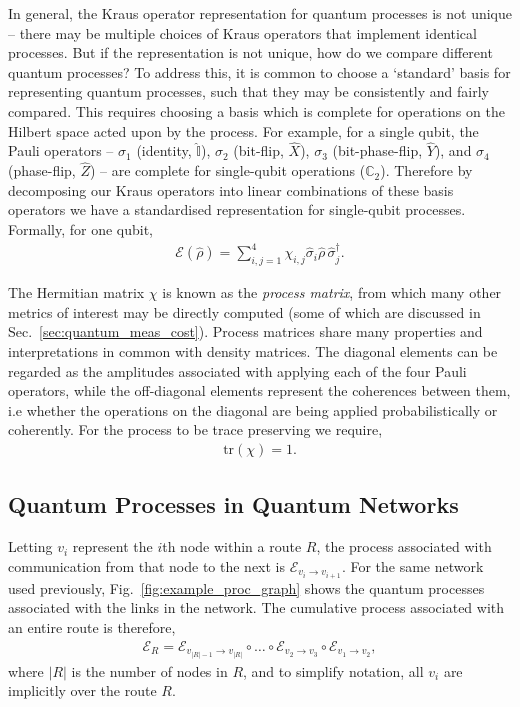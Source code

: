 \documentclass[aps,rmp,twocolumn,amsmath,amssymb,nofootinbib,superscriptaddress]{revtex4}
\begin{document}
In general, the Kraus operator representation for quantum processes is not unique -- there may be multiple choices of Kraus operators that implement identical processes. But if the representation is not unique, how do we compare different quantum processes? To address this, it is common to choose a `standard' basis for representing quantum processes, such that they may be consistently and fairly compared. This requires choosing a basis which is complete for operations on the Hilbert space acted upon by the process. For example, for a single qubit, the Pauli operators -- $\sigma_1$ (identity, $\mathbb{\hat{I}}$), $\sigma_2$ (bit-flip, $\hat{X}$), $\sigma_3$ (bit-phase-flip, $\hat{Y}$), and $\sigma_4$ (phase-flip, $\hat{Z}$) -- are complete for single-qubit operations ($\mathbb{C}_2$). Therefore by decomposing our Kraus operators into linear combinations of these basis operators we have a standardised representation for single-qubit processes. Formally, for one qubit,
\begin{align}
\mathcal{E}(\hat\rho) = \sum_{i,j=1}^4 \chi_{i,j} \hat{\sigma}_i\hat\rho\,\hat{\sigma}_j^\dag.
\end{align}

The Hermitian matrix $\chi$ is known as the \emph{process matrix}, from which many other metrics of interest may be directly computed (some of which are discussed in Sec.~\ref{sec:quantum_meas_cost}). Process matrices share many properties and interpretations in common with density matrices. The diagonal elements can be regarded as the amplitudes associated with applying each of the four Pauli operators, while the off-diagonal elements represent the coherences between them, i.e whether the operations on the diagonal are being applied probabilistically or coherently. For the process to be trace preserving we require,
\begin{align}
\mathrm{tr}(\chi) = 1.
\end{align}

%
%

\subsection{Quantum Processes in Quantum Networks} \label{sec:quant_proc_in}

Letting $v_i$ represent the $i$th node within a route $R$, the process associated with communication from that node to the next is $\mathcal{E}_{v_i\to v_{i+1}}$. For the same network used previously, Fig.~\ref{fig:example_proc_graph} shows the quantum processes associated with the links in the network. The cumulative process associated with an entire route is therefore,
\begin{align}
\mathcal{E}_R = \mathcal{E}_{{v_{|R|-1}}\to v_{|R|}} \circ \dots \circ \mathcal{E}_{v_2\to v_3} \circ \mathcal{E}_{v_1\to v_2},
\end{align}
where $|R|$ is the number of nodes in $R$, and to simplify notation, all $v_i$ are implicitly over the route $R$.
\end{document}
